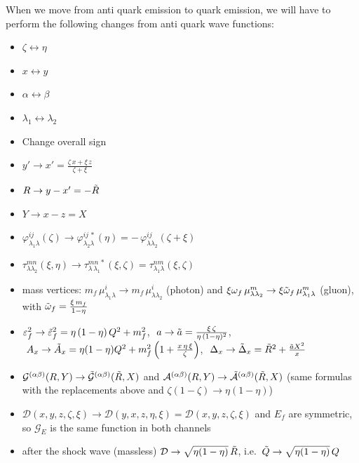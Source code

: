 \documentclass[9pt]{article}
\newcommand{\eps}{\varepsilon_{f}}           %
\newcommand{\epsq}{\Tilde{\varepsilon}_{f}}  %
\newcommand{\om}{\omega_{f}}                 %
\newcommand{\omq}{\Tilde{\omega}_{f}}        %
\newcommand{\Ef}{E_{f}}                      %
\newcommand{\G}[1]{\mathcal{G}^{(#1)}}       %
\newcommand{\Ga}[1]{\mathcal{A}^{(#1)}}      %
\newcommand{\Gq}[1]{\Tilde{\mathcal{G}}^{(#1)}}
\newcommand{\Gaq}[1]{\Tilde{\mathcal{A}}^{(#1)}}
\newcommand{\GE}{\mathcal{G}_{E}}            %
\numberwithin{equation}{section}
\begin{document}
\begin{enumerate}
When we move from anti quark emission to quark emission, we will have to perform the following changes from anti quark wave functions:
\begin{itemize}
    \item $\zeta \leftrightarrow \eta$
    \item $x\leftrightarrow y$
    \item $\alpha \leftrightarrow \beta$
    \item $\lambda_{1}\leftrightarrow \lambda_{2}$
    \item Change overall sign
    \item $y'\rightarrow x' = \frac{\zeta\,x + \xi\, z}{\zeta + \xi}$
    \item $R \rightarrow y-x' = -\Tilde{R}$
    \item $Y \rightarrow x-z  = X$
    \item $\varphi^{ij}_{\lambda_{1}\lambda}(\zeta) \rightarrow \varphi^{ij\,*}_{\lambda_{2}\lambda}(\eta) = -\,\varphi^{ij}_{\lambda\lambda_{2}}(\zeta+\xi)$
    \item $\tau^{mn}_{\lambda\lambda_{2}}(\xi,\eta) \rightarrow \tau^{mn\,*}_{\lambda\,\lambda_{1}}(\xi,\zeta) = \tau^{nm}_{\lambda_{1}\lambda}(\xi,\zeta)$
    \item mass vertices: $m_{f}\,\mu^{i}_{\lambda_{1}\lambda}\rightarrow m_{f}\,\mu^{i}_{\lambda\lambda_{2}}$ (photon) and $\xi\om\,\mu^{m}_{\lambda\lambda_{2}}\rightarrow \xi\omq\,\mu^{m}_{\lambda_{1}\lambda}$ (gluon), with $\omq = \frac{\xi\,m_{f}}{1-\eta}$
    \item $\eps^{2}\rightarrow\epsq^{2} = \eta\,(1-\eta)\,Q^{2}+m^{2}_{f}$, $\ a\rightarrow \Tilde{a} = \frac{\xi\,\zeta}{\eta\,(1-\eta)^{2}}$, $\ A_{x}\rightarrow \Tilde{A}_{x} = \eta(1-\eta)Q^{2}+m^{2}_{f}\left(1+\frac{x\,\eta\,\xi}{\zeta}\right)$, $\ \Delta_{x}\rightarrow\Tilde{\Delta}_{x} = \Tilde{R}^{2}+\frac{\Tilde{a}X^{2}}{x}$
    \item $\G{\alpha\beta}(R,Y)\rightarrow\Gq{\alpha\beta}(\Tilde{R},X)$ and $\Ga{\alpha\beta}(R,Y)\rightarrow\Gaq{\alpha\beta}(\Tilde{R},X)$ (same formulas with the replacements above and $\zeta(1-\zeta)\rightarrow\eta(1-\eta)$)
    \item $\mathcal{D}(x,y,z,\zeta, \xi) \rightarrow \mathcal{D}(y,x,z,\eta,\xi) = \mathcal{D}(x,y,z,\zeta,\xi)$ and $\Ef$ are symmetric, so $\GE$ is the same function in both channels
    \item after the shock wave (massless) $\mathcal{D} \rightarrow \sqrt{\eta(1-\eta)}\,\Tilde{R}$, i.e.\ $\Tilde{Q}\rightarrow\sqrt{\eta(1-\eta)}\,Q$

\end{itemize}
\end{enumerate}
\end{document}
